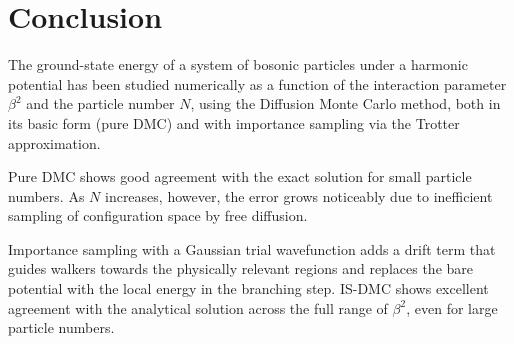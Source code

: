 \documentclass[11pt,a4paper,twoside,pdf]{article}
\numberwithin{equation}{section}
\begin{document}
\newpage
\section{Conclusion}

The ground-state energy of a system of bosonic particles under a harmonic potential
has been studied numerically as a function of the interaction parameter $\beta^2$
and the particle number $N$, using the Diffusion Monte Carlo method, both in its
basic form (pure DMC) and with importance sampling via the Trotter approximation.

Pure DMC shows good agreement with the exact solution for small particle numbers.
As $N$ increases, however, the error grows noticeably due to inefficient sampling of
configuration space by free diffusion.

Importance sampling with a Gaussian trial wavefunction adds a drift term that
guides walkers towards the physically relevant regions and replaces the bare
potential with the local energy in the branching step. IS-DMC shows excellent
agreement with the analytical solution across the full range of $\beta^2$, even for
large particle numbers.

\newpage



\end{document}
